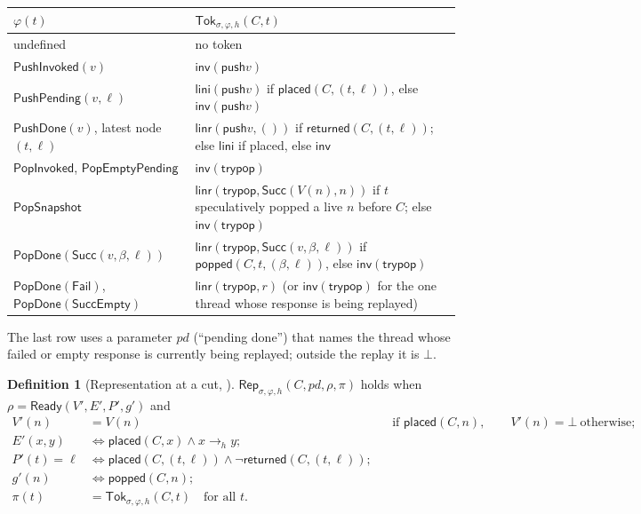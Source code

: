 \documentclass[11pt]{article}
\theoremstyle{definition}
\newtheorem{definition}[lemma]{Definition}
\theoremstyle{remark}
\newcommand{\Ready}{\mathsf{Ready}}
\newcommand{\Inv}{\mathsf{inv}}
\newcommand{\Lini}{\mathsf{lini}}
\newcommand{\Linr}{\mathsf{linr}}
\newcommand{\Push}{\mathsf{push}}
\newcommand{\TryPop}{\mathsf{trypop}}
\newcommand{\Succ}{\mathsf{Succ}}
\newcommand{\Fail}{\mathsf{Fail}}
\newcommand{\Empty}{\mathsf{Empty}}
\newcommand{\conc}{\sigma}
\newcommand{\abst}{\rho}
\newcommand{\tokens}{\pi}
\newcommand{\code}[1]{\texttt{\detokenize{#1}}}
\newcommand{\Rep}{\mathsf{Rep}}
\newcommand{\Tok}{\mathsf{Tok}}
\newcommand{\Placed}{\mathsf{placed}}
\newcommand{\Popped}{\mathsf{popped}}
\newcommand{\RetBefore}{\mathsf{returned}}
\newcommand{\phase}[1]{\mathsf{#1}}
\begin{document}
\begin{center}
\renewcommand{\arraystretch}{1.25}
\begin{tabular}{@{}ll@{}}
\toprule
\(\varphi(t)\) & \(\Tok_{\conc,\varphi,h}(C,t)\)\\
\midrule
undefined & no token\\
\(\phase{PushInvoked}(v)\) & \(\Inv(\Push v)\)\\
\(\phase{PushPending}(v,\ell)\) &
  \(\Lini(\Push v)\) if \(\Placed(C,(t,\ell))\), else \(\Inv(\Push v)\)\\
\(\phase{PushDone}(v)\), latest node \((t,\ell)\) &
  \(\Linr(\Push v,())\) if \(\RetBefore(C,(t,\ell))\); else
  \(\Lini\) if placed, else \(\Inv\)\\
\(\phase{PopInvoked}\), \(\phase{PopEmptyPending}\) & \(\Inv(\TryPop)\)\\
\(\phase{PopSnapshot}\) &
  \(\Linr(\TryPop,\Succ(V(n),n))\) if \(t\) speculatively popped a live
  \(n\) before \(C\); else \(\Inv(\TryPop)\)\\
\(\phase{PopDone}(\Succ(v,\beta,\ell))\) &
  \(\Linr(\TryPop,\Succ(v,\beta,\ell))\) if \(\Popped(C,t,(\beta,\ell))\),
  else \(\Inv(\TryPop)\)\\
\(\phase{PopDone}(\Fail)\), \(\phase{PopDone}(\Succ\Empty)\) &
  \(\Linr(\TryPop,r)\) (or \(\Inv(\TryPop)\) for the one thread whose
  response is being replayed)\\
\bottomrule
\end{tabular}
\end{center}

The last row uses a parameter \(pd\) (``pending done'') that names the
thread whose failed or empty response is currently being replayed; outside
the replay it is \(\bot\).

\begin{definition}[Representation at a cut, \code{represents_at}]
\(\Rep_{\conc,\varphi,h}(C,pd,\abst,\tokens)\) holds when
\(\abst=\Ready(V',E',P',g')\) and
\begin{align*}
  V'(n)&=V(n) &&\text{if }\Placed(C,n),\qquad V'(n)=\bot\ \text{otherwise};\\
  E'(x,y)&\iff \Placed(C,x)\land x\to_h y;\\
  P'(t)=\ell&\iff \Placed(C,(t,\ell))\land\lnot\RetBefore(C,(t,\ell));\\
  g'(n)&\iff\Popped(C,n);\\
  \tokens(t)&=\Tok_{\conc,\varphi,h}(C,t)\quad\text{for all }t.
\end{align*}
\end{definition}
\end{document}

